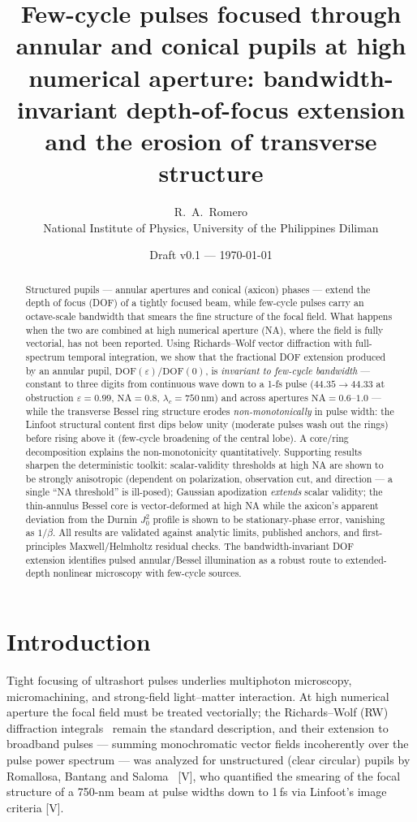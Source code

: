 \documentclass[11pt]{article}
\title{Few-cycle pulses focused through annular and conical pupils at high
numerical aperture: bandwidth-invariant depth-of-focus extension and the
erosion of transverse structure}
\author{R.~A.~Romero\\ \small National Institute of Physics, University of the
Philippines Diliman\\ \small \todo{author list / affiliations to confirm}}
\date{Draft v0.1 --- \today}
\begin{document}
\maketitle

\begin{abstract}
Structured pupils --- annular apertures and conical (axicon) phases --- extend
the depth of focus (DOF) of a tightly focused beam, while few-cycle pulses
carry an octave-scale bandwidth that smears the fine structure of the focal
field. What happens when the two are combined at high numerical aperture (NA),
where the field is fully vectorial, has not been reported. Using
Richards--Wolf vector diffraction with full-spectrum temporal integration, we
show that the fractional DOF extension produced by an annular pupil,
$\mathrm{DOF}(\varepsilon)/\mathrm{DOF}(0)$, is \emph{invariant to few-cycle
bandwidth} --- constant to three digits from continuous wave down to a 1-fs
pulse ($44.35\!\to\!44.33$ at obstruction $\varepsilon=0.99$, $\mathrm{NA}=0.8$,
$\lambda_c=750$\,nm) and across apertures $\mathrm{NA}=0.6$--$1.0$ --- while the
transverse Bessel ring structure erodes \emph{non-monotonically} in pulse
width: the Linfoot structural content first dips below unity (moderate pulses
wash out the rings) before rising above it (few-cycle broadening of the central
lobe). A core/ring decomposition explains the non-monotonicity quantitatively.
Supporting results sharpen the deterministic toolkit: scalar-validity
thresholds at high NA are shown to be strongly anisotropic (dependent on
polarization, observation cut, and direction --- a single ``NA threshold'' is
ill-posed); Gaussian apodization \emph{extends} scalar validity; the
thin-annulus Bessel core is vector-deformed at high NA while the axicon's
apparent deviation from the Durnin $J_0^2$ profile is shown to be
stationary-phase error, vanishing as $1/\beta$. All results are validated
against analytic limits, published anchors, and first-principles
Maxwell/Helmholtz residual checks. The bandwidth-invariant DOF extension
identifies pulsed annular/Bessel illumination as a robust route to extended-
depth nonlinear microscopy with few-cycle sources.
\end{abstract}

\section{Introduction}

Tight focusing of ultrashort pulses underlies multiphoton microscopy,
micromachining, and strong-field light--matter interaction. At high numerical
aperture the focal field must be treated vectorially; the Richards--Wolf (RW)
diffraction integrals~\cite{Wolf1959,RichardsWolf1959} remain the standard
description, and their extension to broadband pulses --- summing monochromatic
vector fields incoherently over the pulse power spectrum --- was analyzed for
unstructured (clear circular) pupils by Romallosa, Bantang and
Saloma~\cite{Romallosa2003} [V], who quantified the smearing of the focal
structure of a 750-nm beam at pulse widths down to 1\,fs via Linfoot's image
criteria [V].
\end{document}

